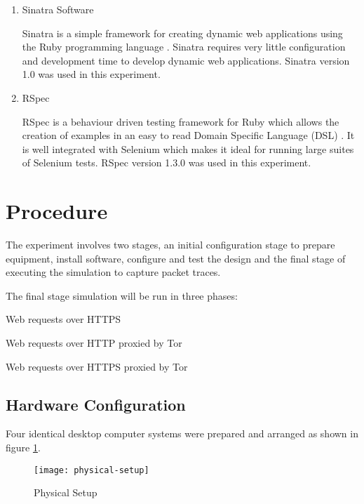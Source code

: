 \begin{enumerate}
  \item Sinatra Software

  Sinatra is a simple framework for creating dynamic web applications using the
  Ruby programming language \parencite{:2010bh}. Sinatra requires very little
  configuration and development time to develop dynamic web applications.
  Sinatra version 1.0 was used in this experiment.

  \item RSpec

  RSpec is a behaviour driven testing framework for Ruby which allows the
  creation of examples in an easy to read Domain Specific Language (DSL)
  \parencite{Chelimsky:2010vn}. It is well integrated with Selenium which makes
  it ideal for running large suites of Selenium tests. RSpec version 1.3.0 was
  used in this experiment.

\end{enumerate}

\section{Procedure}

The experiment involves two stages, an initial configuration stage to prepare
equipment, install software, configure and test the design and the final stage
of executing the simulation to capture packet traces.

The final stage simulation will be run in three phases:

\begin{enumerate*}
  \item Web requests over HTTPS
  \item Web requests over HTTP proxied by Tor
  \item Web requests over HTTPS proxied by Tor
\end{enumerate*}

\subsection{Hardware Configuration}

Four identical desktop computer systems were prepared and arranged as shown
in figure \ref{fig:physical-setup}.

\begin{figure}[H]
  \centering\texttt{[image: physical-setup]}
  \caption{Physical Setup}
  \label{fig:physical-setup}
\end{figure}

